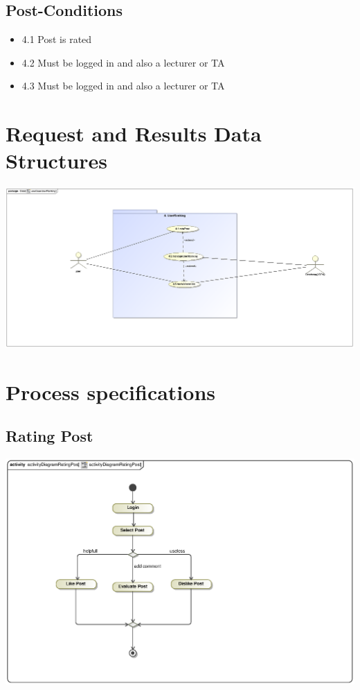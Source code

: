 \documentclass{scrreprt}
\begin{document}
\subsection{Post-Conditions}%
\begin{itemize}
  \item 4.1 Post is rated
  \item 4.2 Must be logged in and also a lecturer or TA
  \item 4.3 Must be logged in and also a lecturer or TA
\end{itemize}

\section{Request and Results Data Structures} 
\includegraphics[scale=.9]{Kgomotso/graphics/useCaseUserRanking.eps}\\

\section{Process specifications}
\subsection{Rating Post}
\includegraphics[scale=.9]{Kgomotso/graphics/activityDiagramRatingPost.eps}\\
\end{document}
